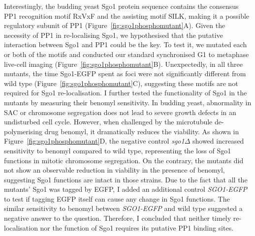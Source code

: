 Interestingly, the budding yeast Sgo1 protein sequence contains the consensus PP1 recognition motif RxVxF and the assisting motif SILK, making it a possible regulatory subunit of PP1 (Figure~\ref{fig:sgo1phosphomutant}A). Given the necessity of PP1 in re-localising Sgo1, we hypothesised that the putative interaction between Sgo1 and PP1 could be the key. To test it, we mutated each or both of the motifs and conducted our standard synchronised G1 to metaphase live-cell imaging (Figure~\ref{fig:sgo1phosphomutant}B). Unexpectedly, in all three mutants, the time Sgo1-EGFP spent as foci were not significantly different from wild type (Figure~\ref{fig:sgo1phosphomutant}C), suggesting these motifs are not required for Sgo1 re-localisation. I further tested the functionality of Sgo1 in the mutants by measuring their benomyl sensitivity. In budding yeast, abnormality in SAC or chromosome segregation does not lead to severe growth defects in an undisturbed cell cycle. However, when challenged by the microtubule de-polymerising drug benomyl, it dramatically reduces the viability. As shown in Figure~\ref{fig:sgo1phosphomutant}D, the negative control \textit{sgo1$\Delta$} showed increased sensitivity to benomyl compared to wild type, representing the loss of Sgo1 functions in mitotic chromosome segregation. On the contrary, the mutants did not show an observable reduction in viability in the presence of benomyl, suggesting Sgo1 functions are intact in those strains. Due to the fact that all the mutants' Sgo1 was tagged by EGFP, I added an additional control \textit{SGO1-EGFP} to test if tagging EGFP itself can cause any change in Sgo1 functions. The similar sensitivity to benomyl between \textit{SGO1-EGFP} and wild type suggested a negative answer to the question. Therefore, I concluded that neither timely re-localisation nor the function of Sgo1 requires its putative PP1 binding sites. 

